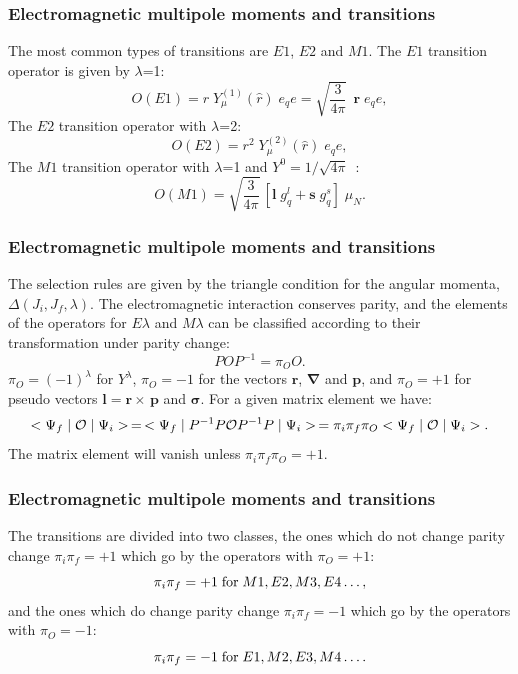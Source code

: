 \documentclass[compress]{beamer}
\renewcommand{\vec}[1]{\mathbf{#1}}
\renewcommand{\vec}[1]{\boldsymbol{#1}}
\begin{document}
\frame
{
\frametitle{Electromagnetic multipole moments and transitions}
\begin{small}
{\scriptsize
The most common types of transitions are $  E1  $, $  E2  $ and $  M1  $.
The $  E1  $ transition operator is given by 
$\lambda$=1:
$$
O(E1) = r \; Y^{(1)}_{\mu }(\hat{r}) \; e_{q} e
= \sqrt{\frac{3}{4\pi }}\, \; \vec{r} \; e_{q} e, 
$$
The $  E2  $ transition operator with
$\lambda$=2:
$$
O(E2) = r^{2} \; Y^{(2)}_{\mu }(\hat{r}) \; e_{q} e,  
$$
The $  M1  $ transition operator with $\lambda$=1 and
$  Y^{0}=1/\sqrt{4\pi }\,  $ :
$$
O(M1) = \sqrt{ \frac{3}{4\pi }}\, [\vec{l} \; g^{l }_{q}
+ \vec{s} \; g^{s}_{q}] \; \mu _{N}. 
$$

}
\end{small}
}
\frame
{
\frametitle{Electromagnetic multipole moments and transitions}
\begin{small}
{\scriptsize
The selection rules are given by the triangle condition for the
angular momenta, $  \Delta (J_{i},J_{f},\lambda )  $. The electromagnetic
interaction conserves parity, and the elements of the
operators for $  E\lambda   $ and $  M\lambda   $
can be classified according to their transformation under parity
change:
$$
POP^{-1} = \pi _{O} O. 
$$
$  \pi _{O}=(-1)^{\lambda }  $ for $  Y^{\lambda }  $,
$  \pi _{O}=-1  $ for the vectors
$\vec{r}$, $\vec{\nabla}$ and $\vec{p}$, and $  \pi _{O}=+1  $ for pseudo vectors
$  \vec{l}=\vec{r} \times\,  \vec{p}  $ and $\vec{\sigma}$. For a given matrix element we have:
$$
<\Psi _{f}\mid {\cal O}\mid \Psi _{i}>\, =\, <\Psi _{f}\mid P^{-1}P{\cal O}P^{-1}P\mid \Psi _{i}>\, 
=
\pi _{i}\pi _{f}\pi _{O} <\Psi _{f}\mid {\cal O}\mid \Psi _{i}>. 
$$
The matrix element will vanish unless  $  \pi _{i}\pi _{f}\pi _{O}=+1  $.
}
\end{small}
}
\frame
{
\frametitle{Electromagnetic multipole moments and transitions}
\begin{small}
{\scriptsize
The transitions are divided into two classes, the
ones which do not change parity change $  \pi _{i}\pi _{f}=+1  $ which go by the
operators with $  \pi _{O}=+1  $:
$$
\pi _{i}\pi _{f}=+1 \; {\rm for} \; M1, E2, M3, E4 \dots,
$$
and the ones which do change parity change $  \pi _{i}\pi _{f}=-1  $
which go by the operators with $  \pi _{O}=-1  $:
$$
\pi _{i}\pi _{f}=-1 \; {\rm for} \; E1, M2, E3, M4 \dots.
$$

}
\end{small}
}
\end{document}
